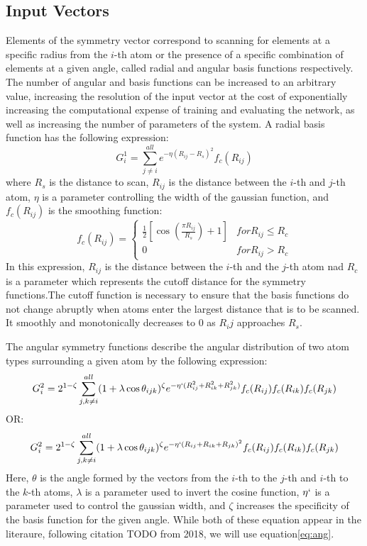 \documentclass{article}
\begin{document}
\subsection{Input Vectors}
Elements of the symmetry vector correspond to scanning for elements at a specific radius from the $i$-th atom or the presence of a specific combination of elements at a given angle, called radial and angular basis functions respectively.
 The number of angular and basis functions can be increased to an arbitrary value, increasing the resolution of the input vector at the cost of exponentially increasing the computational expense of training and evaluating the network, as well as increasing the number of parameters of the system. 
 A radial basis function has the following expression:
\begin{equation}\label{eq:rad}
	G^{1}_{i} = \sum_{j \neq i}^{all} e^{-\eta ( R_{ij} - R_{s})^2} f_{c}(R_{ij})
\end{equation}
where $R_s$ is the distance to scan, $R_{ij}$ is the distance between the $i$-th and $j$-th atom, $\eta$ is a parameter controlling the width of the gaussian function, and $f_c(R_{ij})$ is the smoothing function:
\begin{equation}
 	f_c(R_{ij}) = 
	\begin{cases}
		\frac{1}{2}\left[\cos{(\frac{\pi R_{ij}} {R_s})} + 1 \right] & for R_{ij} \leq R_{c} \\
		0 & for R_{ij} > R_c

	\end{cases}
\end{equation}
In this expression, $R_{ij}$ is the distance between the $i$-th and the $j$-th atom nad $R_c$ is a parameter which represents the cutoff distance for the symmetry functions.The cutoff function is necessary to ensure that the basis functions do not change abruptly when atoms enter the largest distance that is to be scanned. It smoothly and monotonically decreases to 0 as $R_ij$ approaches $R_s$.

The angular symmetry functions describe the angular distribution of two atom types surrounding a given atom by the following expression:
\begin{equation}\label{eq:angnotused}
	G_i^2 = 2^{1 - \zeta} \sum_{j,k \neq i}^{all} ( 1 + \lambda \cos{\theta_{ijk}}) ^\zeta e^{-\eta` ( R_{ij}^2 + R_{ik}^2 + R_{jk}^2)} f_c (R_{ij}) f_c(R_{ik}) f_c(R_{jk})
\end{equation}
OR:
\begin{equation}\label{eq:ang}
	G_i^2 = 2^{1 - \zeta} \sum_{j,k \neq i}^{all} ( 1 + \lambda \cos{\theta_{ijk}}) ^\zeta e^{-\eta` ( R_{ij} + R_{ik} + R_{jk})^2} f_c (R_{ij}) f_c(R_{ik}) f_c(R_{jk})
\end{equation}
Here, $\theta$ is the angle formed by the vectors from the $i$-th to the $j$-th and $i$-th to the $k$-th atoms, $\lambda$ is a parameter used to invert the  cosine function, $\eta `$ is a parameter used to control the gaussian width, and $\zeta$ increases the specificity of the basis function for the given angle. While both of these equation appear in the literaure, following citation TODO from 2018, we will use equation\eqref{eq:ang}.
\end{document}
